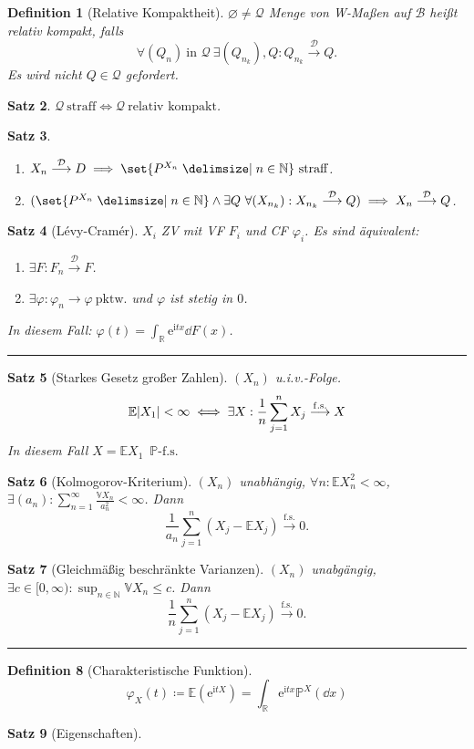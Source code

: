 \documentclass[a4paper,8pt]{article}
\newcounter{Sec}
\theoremstyle{nonumberbreak}
\newtheorem{definition}{Definition}[Sec]
\newtheorem{satz}[definition]{Satz}
\newcommand{\sep}{%
	\rule{\linewidth}{0.15pt}%
	\stepcounter{Sec}%
	}
\newcommand{\defas}{\coloneqq}
\renewcommand{\P}{\mathbb{P}}
\newcommand{\R}{\mathbb{R}}
\newcommand{\E}{\mathbb{E}}
\newcommand{\V}{\mathbb{V}}
\newcommand{\N}{\mathbb{N}}
\newcommand{\cf}{\varphi}
\newcommand{\e}{\mathrm{e}}
\renewcommand{\i}{\mathrm{i}}
\newcommand{\fsk}{\mathrel{\stackrel{\operatorname{f.s.}}{\longrightarrow}}}
\newcommand{\vk}{\mathrel{\stackrel{\mathcal{D}}{\longrightarrow}}}
\newcommand{\fs}[1]{~\operatorname{#1-f.s.}}
\begin{document}
\begin{multicols}{3}
\begin{definition}[Relative Kompaktheit]
		$\varnothing\neq\mathcal{Q}$ Menge von W-Maßen auf $\mathcal{B}$ heißt relativ kompakt, falls
		\[\forall (Q_n)~\text{in $\mathcal{Q}$}~\exists (Q_{n_k}), Q: Q_{n_k}\vk Q.\]
		Es wird \textit{nicht} $Q\in\mathcal{Q}$ gefordert.
	\end{definition}
	\begin{satz}
		$\mathcal{Q}~\text{straff}\iff\mathcal{Q}~\text{relativ kompakt}$.
	\end{satz}
	\begin{satz}
		\begin{enumerate}[label=(\alph*)]
			\item $X_n\vk D\implies\set{P^{X_n}\given n\in\N}~\text{straff}$.
			\item $(\set{P^{X_n}\given n\in\N}\wedge \exists Q~\forall (X_{n_k}): X_{n_k}\vk Q)\implies X_n\vk Q$.
		\end{enumerate}
	\end{satz}
	\begin{satz}[Lévy-Cramér]
		$X_i$ ZV mit VF $F_i$ und CF $\cf_i$. Es sind äquivalent:
		\begin{enumerate}[label=(\alph*)]
			\item $\exists F: F_n\vk F$.
			\item $\exists \cf: \cf_n\to\cf~\text{pktw.}$ und $\cf$ ist stetig in $0$.
		\end{enumerate}
		In diesem Fall: $\cf(t)=\int_\R\e^{\i tx}\dd{F(x)}$.
	\end{satz}
	\sep
	\begin{satz}[Starkes Gesetz großer Zahlen]
		$(X_n)$ u.i.v.-Folge.
		\[
			\E\abs{X_1}<\infty\iff
			\exists X:\frac{1}{n}\sum_{j=1}^nX_j\fsk X
		\]
		In diesem Fall $X=\E X_1 \fs{\P}$
	\end{satz}
	\begin{satz}[Kolmogorov-Kriterium]
		$(X_n)$ unabhängig, $\forall n:\E X_n^2<\infty$, $\exists (a_n): \sum_{n=1}^\infty \frac{\V X_n}{a_n^2}<\infty$.
		Dann \[\frac{1}{a_n}\sum_{j=1}^n(X_j-\E X_j)\fsk 0.\]
	\end{satz}
	\begin{satz}[Gleichmäßig beschränkte Varianzen]
		$(X_n)$ unabgängig, $\exists c\in[0,\infty):\sup_{n\in\N}\V X_n\leq c$. Dann
		\[\frac{1}{n}\sum_{j=1}^n(X_j-\E X_j)\fsk 0.\]
	\end{satz}
	\sep
	\begin{definition}[Charakteristische Funktion]
		\[
			\cf_X(t)\defas \E(\e^{\i tX}) = \int_\R \e^{\i tx}\P^X(\dd{x})
		\]
	\end{definition}
	\begin{satz}[Eigenschaften]

\end{satz}
\end{multicols}
\end{document}
